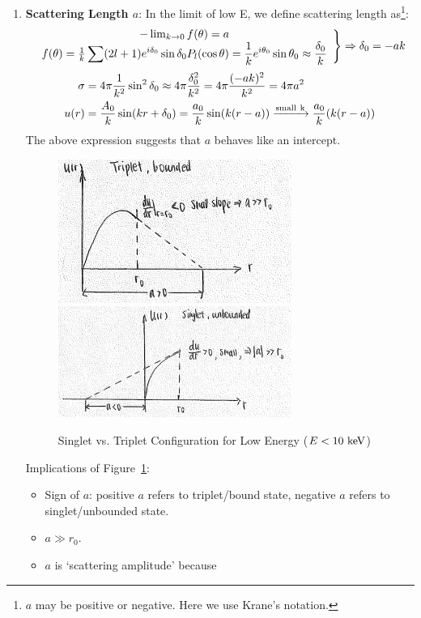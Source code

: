 \documentclass{school-22.101-notes}
\begin{document}
\begin{enumerate}
\item \textbf{Scattering Length $a$}: In the limit of low E, we define scattering length as\footnote{$a$ may be positive or negative. Here we use Krane's notation.}:
\begin{align}
\left. \begin{array}{c}
- \lim_{k\to 0} f(\theta) = a  \\
f(\theta) = \frac{1}{k} \displaystyle\sum (2l+1) e^{i \delta_0} \sin \delta_0  P_l (\cos \theta) = \frac{1}{k} e^{i\theta_0} \sin \theta_0  \approx \frac{\delta_0}{k} 
\end{array} 
\right\} \Rightarrow \delta_0 = -ak
\end{align}
\begin{align}
\sigma &= 4 \pi \frac{1}{k^2} \sin^2 \delta_0 \approx 4 \pi \frac{\delta_0^2}{k^2} =  4 \pi \frac{(-ak)^2}{k^2} = 4 \pi a^2 \\
u(r) &= \frac{A_0}{k} \sin(kr + \delta_0) = \frac{a_0}{k} \sin (k(r-a)) \xrightarrow{\mathrm{small \mbox{ } k}} \frac{a_0}{k} (k(r-a))
\end{align} 
The above expression suggests that $a$ behaves like an intercept.

\begin{figure}
    \includegraphics[width=3in]{images/scattering/s-wave-triplet.png}
    \includegraphics[width=3in]{images/scattering/s-wave-singlet.png}    
    \caption{Singlet vs. Triplet Configuration for Low Energy ($E<10 \mbox{ } \mathrm{keV}$)\label{scattering-s-wave}}
\end{figure}
Implications of Figure~\ref{scattering-s-wave}:
\begin{itemize}
\item Sign of $a$:  positive $a$ refers to triplet/bound state, negative $a$ refers to singlet/unbounded state. 
\item $a \gg r_0$. 
\item $a$ is `scattering amplitude' because 
\end{itemize}
\end{enumerate}
\end{document}
